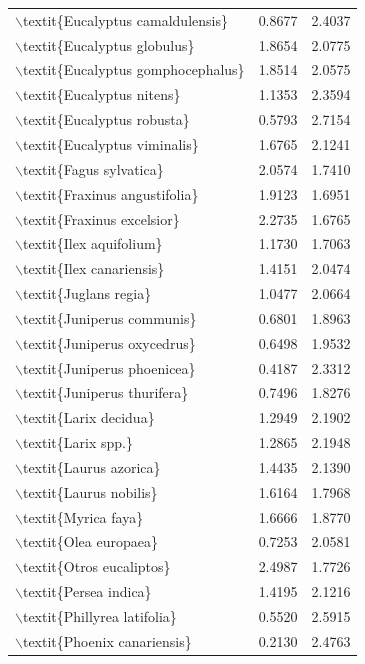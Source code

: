 \begin{table}[ht]
\begin{tabular}{lrr}
  $\backslash$textit\{Eucalyptus camaldulensis\} & 0.8677 & 2.4037 \\ 
  $\backslash$textit\{Eucalyptus globulus\} & 1.8654 & 2.0775 \\ 
  $\backslash$textit\{Eucalyptus gomphocephalus\} & 1.8514 & 2.0575 \\ 
  $\backslash$textit\{Eucalyptus nitens\} & 1.1353 & 2.3594 \\ 
  $\backslash$textit\{Eucalyptus robusta\} & 0.5793 & 2.7154 \\ 
  $\backslash$textit\{Eucalyptus viminalis\} & 1.6765 & 2.1241 \\ 
  $\backslash$textit\{Fagus sylvatica\} & 2.0574 & 1.7410 \\ 
  $\backslash$textit\{Fraxinus angustifolia\} & 1.9123 & 1.6951 \\ 
  $\backslash$textit\{Fraxinus excelsior\} & 2.2735 & 1.6765 \\ 
  $\backslash$textit\{Ilex aquifolium\} & 1.1730 & 1.7063 \\ 
  $\backslash$textit\{Ilex canariensis\} & 1.4151 & 2.0474 \\ 
  $\backslash$textit\{Juglans regia\} & 1.0477 & 2.0664 \\ 
  $\backslash$textit\{Juniperus communis\} & 0.6801 & 1.8963 \\ 
  $\backslash$textit\{Juniperus oxycedrus\} & 0.6498 & 1.9532 \\ 
  $\backslash$textit\{Juniperus phoenicea\} & 0.4187 & 2.3312 \\ 
  $\backslash$textit\{Juniperus thurifera\} & 0.7496 & 1.8276 \\ 
  $\backslash$textit\{Larix decidua\} & 1.2949 & 2.1902 \\ 
  $\backslash$textit\{Larix spp.\} & 1.2865 & 2.1948 \\ 
  $\backslash$textit\{Laurus azorica\} & 1.4435 & 2.1390 \\ 
  $\backslash$textit\{Laurus nobilis\} & 1.6164 & 1.7968 \\ 
  $\backslash$textit\{Myrica faya\} & 1.6666 & 1.8770 \\ 
  $\backslash$textit\{Olea europaea\} & 0.7253 & 2.0581 \\ 
  $\backslash$textit\{Otros eucaliptos\} & 2.4987 & 1.7726 \\ 
  $\backslash$textit\{Persea indica\} & 1.4195 & 2.1216 \\ 
  $\backslash$textit\{Phillyrea latifolia\} & 0.5520 & 2.5915 \\ 
  $\backslash$textit\{Phoenix canariensis\} & 0.2130 & 2.4763 \\ 

\end{tabular}
\end{table}
